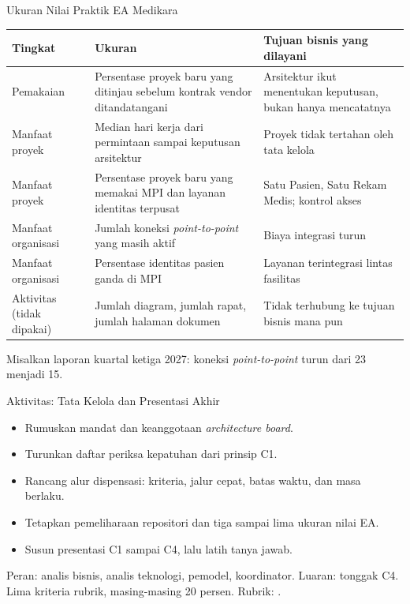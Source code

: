 \documentclass[aspectratio=169, table, 12pt]{beamer}
\begin{document}
\begin{frame}{{\Large Ukuran Nilai Praktik EA Medikara}}
  \scriptsize
  \begin{tabularx}{\textwidth}{L{2.5cm}YY}
    \hline
    \textbf{Tingkat} & \textbf{Ukuran} & \textbf{Tujuan bisnis yang dilayani} \\
    \hline
    Pemakaian & Persentase proyek baru yang ditinjau sebelum kontrak vendor
      ditandatangani & Arsitektur ikut menentukan keputusan, bukan hanya mencatatnya \\
    \hline
    Manfaat proyek & Median hari kerja dari permintaan sampai keputusan
      arsitektur & Proyek tidak tertahan oleh tata kelola \\
    \hline
    Manfaat proyek & Persentase proyek baru yang memakai MPI dan layanan
      identitas terpusat & Satu Pasien, Satu Rekam Medis; kontrol akses \\
    \hline
    Manfaat organisasi & Jumlah koneksi \textit{point-to-point} yang masih aktif & Biaya integrasi turun \\
    \hline
    Manfaat organisasi & Persentase identitas pasien ganda di MPI &
      Layanan terintegrasi lintas fasilitas \\
    \hline
    Aktivitas (tidak dipakai) & Jumlah diagram, jumlah rapat, jumlah
      halaman dokumen & Tidak terhubung ke tujuan bisnis mana pun \\
    \hline
  \end{tabularx}

  \vspace{6pt}
  \small Misalkan laporan kuartal ketiga 2027: koneksi \textit{point-to-point} turun dari 23 menjadi 15.
\end{frame}

\begin{frame}{{\Large Aktivitas: Tata Kelola dan Presentasi Akhir}}
  \small
  \begin{itemize}
    \item Rumuskan mandat dan keanggotaan \textit{architecture board}.
    \item Turunkan daftar periksa kepatuhan dari prinsip C1.
    \item Rancang alur dispensasi: kriteria, jalur cepat, batas waktu, dan masa berlaku.
    \item Tetapkan pemeliharaan repositori dan tiga sampai lima ukuran nilai EA.
    \item Susun presentasi C1 sampai C4, lalu latih tanya jawab.
  \end{itemize}
  \footnotesize Peran: analis bisnis, analis teknologi, pemodel, koordinator. Luaran: tonggak C4.
  Lima kriteria rubrik, masing-masing 20 persen.
  Rubrik: .
\end{frame}
\end{document}

